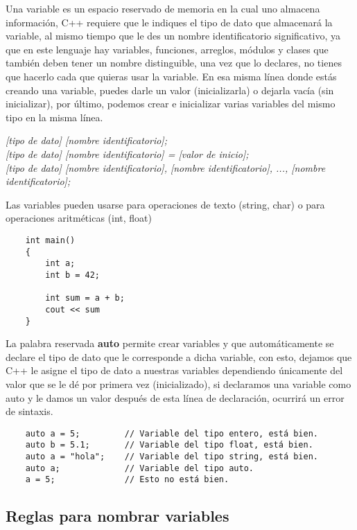 Una variable es un espacio reservado de memoria en la cual uno almacena información, C++ requiere que le indiques el tipo de dato que almacenará la variable, al mismo tiempo que le des un nombre identificatorio significativo, ya que en este lenguaje hay variables, funciones, arreglos, módulos y clases que también deben tener un nombre distinguible, una vez que lo declares, no tienes que hacerlo cada que quieras usar la variable. En esa misma línea donde estás creando una variable, puedes darle un valor (inicializarla) o dejarla vacía (sin inicializar), por último, podemos crear e inicializar varias variables del mismo tipo en la misma línea.
\begin{center}
    \textit{[tipo de dato] [nombre identificatorio];} \\
    \textit{[tipo de dato] [nombre identificatorio] = [valor de inicio];} \\
    \textit{[tipo de dato] [nombre identificatorio], [nombre identificatorio], ..., [nombre identificatorio];}
\end{center}

Las variables pueden usarse para operaciones de texto (string, char) o para operaciones aritméticas (int, float)
\begin{lstlisting}
    int main()
    {
        int a;
        int b = 42;
        
        int sum = a + b;
        cout << sum
    }
\end{lstlisting}

La palabra reservada \textbf{auto} permite crear variables y que automáticamente se declare el tipo de dato que le corresponde a dicha variable, con esto, dejamos que C++ le asigne el tipo de dato a nuestras variables dependiendo únicamente del valor que se le dé por primera vez (inicializado), si declaramos una variable como auto y le damos un valor después de esta línea de declaración, ocurrirá un error de sintaxis.
\begin{lstlisting}
    auto a = 5;         // Variable del tipo entero, está bien.
    auto b = 5.1;       // Variable del tipo float, está bien.
    auto a = "hola";    // Variable del tipo string, está bien.
    auto a;             // Variable del tipo auto.
    a = 5;              // Esto no está bien.
\end{lstlisting}


\subsection{Reglas para nombrar variables}

